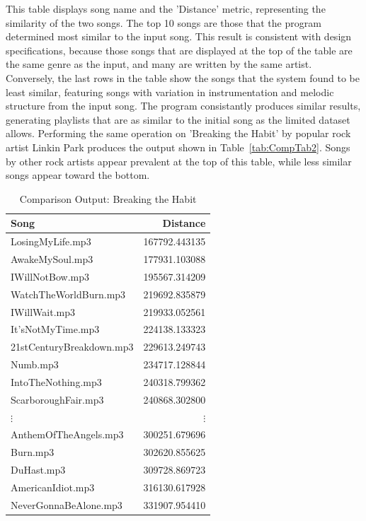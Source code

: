 \documentclass[conference]{IEEEtran}
\begin{document}
This table displays song name and the 'Distance' metric, representing the similarity of the two songs. The top 10 songs are those that the program determined most similar to the input song. This result is consistent with design specifications, because those songs that are displayed at the top of the table are the same genre as the input, and many are written by the same artist. Conversely, the last rows in the table show the songs that the system found to be least similar, featuring songs with variation in instrumentation and melodic structure from the input song. The program consistantly produces similar results, generating playlists that are as similar to the initial song as the limited dataset allows. Performing the same operation on 'Breaking the Habit' by popular rock artist Linkin Park produces the output shown in Table~\eqref{tab:CompTab2}. Songs by other rock artists appear prevalent at the top of this table, while less similar songs appear toward the bottom. 
\begin{table}[htbp]
  \centering
  \caption{Comparison Output: Breaking the Habit}\label{tab:CompTab2}
  \begin{tabular}{lr}
    \toprule
    \textbf{Song} & \textbf{Distance} \\
    \midrule
    LosingMyLife.mp3 & 167792.443135 \\
    AwakeMySoul.mp3 & 177931.103088 \\
    IWillNotBow.mp3 & 195567.314209 \\
    WatchTheWorldBurn.mp3 & 219692.835879 \\
    IWillWait.mp3 & 219933.052561 \\
    It'sNotMyTime.mp3 & 224138.133323 \\
    21stCenturyBreakdown.mp3 & 229613.249743 \\
    Numb.mp3 & 234717.128844 \\
    IntoTheNothing.mp3 & 240318.799362 \\
    ScarboroughFair.mp3 & 240868.302800 \\
    \midrule
    $\vdots$ & $\vdots$ \\
    \midrule
    AnthemOfTheAngels.mp3 & 300251.679696 \\
    Burn.mp3 & 302620.855625 \\
    DuHast.mp3 & 309728.869723 \\
    AmericanIdiot.mp3 & 316130.617928 \\
    NeverGonnaBeAlone.mp3 & 331907.954410 \\
    \bottomrule
  \end{tabular}
\end{table}
\end{document}
